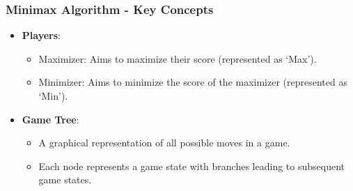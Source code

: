 \documentclass[aspectratio=169]{beamer}
\begin{document}
\begin{frame}[fragile]
    \frametitle{Minimax Algorithm - Key Concepts}
    \begin{itemize}
        \item \textbf{Players}:
        \begin{itemize}
            \item Maximizer: Aims to maximize their score (represented as ‘Max’).
            \item Minimizer: Aims to minimize the score of the maximizer (represented as ‘Min’).
        \end{itemize}
        
        \item \textbf{Game Tree}:
        \begin{itemize}
            \item A graphical representation of all possible moves in a game.
            \item Each node represents a game state with branches leading to subsequent game states.
        \end{itemize}
    \end{itemize}
\end{frame}
\end{document}
